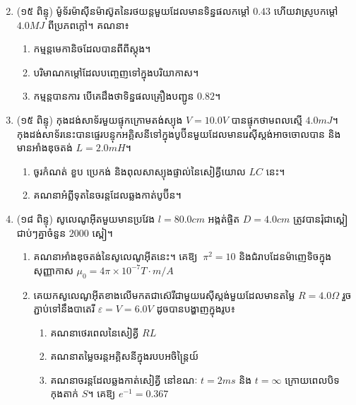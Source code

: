 \documentclass{officialexam}
\begin{document}
\begin{enumerate}[I]
\begin{multicols}{2}
\begin{tikzpicture}[x=1.0cm,y=1.0cm, scale=0.7]
			\end{tikzpicture}
		\end{multicols}
		\item (១៥ ពិន្ទុ)  ម៉ូទ័រម៉ាសុីនម៉ាស៊ូតនៃរថយន្តមួយដែលមានទិន្នផលកម្តៅ $0.43$ ហើយវាស្រូបកម្តៅ $4.0MJ$ ពីប្រភពក្តៅ។ គណនា៖
		\begin{enumerate}[k]
			\item កម្មន្តមេកានិចដែលបានពីពីស្តុង។
			\item បរិមាណកម្តៅដែលបញ្ចេញទៅក្នុងបរិយាកាស។
			\item កម្មន្តបានការ បើគេដឹងថាទិន្នផលគ្រឿងបញ្ជូន $0.82$។
		\end{enumerate}
		\item (១៥ ពិន្ទុ) កុងដង់សាទ័រមួយផ្ទុកក្រោមតង់ស្យុង $V=10.0V$ បានផ្ទុកថាមពលស្មើ $4.0mJ$។ កុងដង់សាទ័រនេះបានផ្ទេរបន្ទុកអគ្គិសនីទៅក្នុងបូប៊ីនមួយដែលមានរេសុីស្តង់អាចចោលបាន និងមានអាំងឌុចតង់ $L=2.0mH$។
		\begin{enumerate}[k]
			\item ចូរកំណត់ ខួប ប្រេកង់ និងពុល​​សា​​ស្យុងផ្ទាល់នៃសៀគ្វីយោល $LC$ នេះ។
			\item គណនាអំព្លីទុតនៃចរន្តដែលឆ្លងកាត់បូប៊ីន។
		\end{enumerate}
		\item (១៨ ពិន្ទុ) សូលេណូអុីតមួយមានប្រវែង $l=80.0cm$ អង្កត់ផ្ចិត $D=4.0cm$ ត្រូវបានរុំជា​​ស្ពៀ​​​​ជាប់ៗ​​គ្នាចំនួន $2000$ ស្ពៀ។
		\begin{enumerate}[m]
			\item គណនាអាំងឌុចតង់នៃសូលេណូអុីតនេះ។ គេឱ្យ $~\pi^2=10$ និងជំរាបដែនម៉ាញេទិចក្នុងសុញ្ញាកាស $\mu_0=4\pi\times10^{-7}T\cdot m/A$
			\item គេយកសូលេណូអុីតខាងលើមកតជាស៊េរីជាមួយរេសុីស្តង់មួយដែលមានតម្លៃ $R=4.0\Omega$ រួចភ្ជាប់ទៅនឹងបាតេរី $\varepsilon=V=6.0V$ ដូចបានបង្ហាញក្នុងរូប៖
			\begin{multicols}{2}
				\begin{enumerate}[k]
					\item គណនាថេរពេលនៃសៀគ្វី $RL$
					\item គណនាតម្លៃចរន្តអគ្គិសនីក្នុងរបបអចិ​​ន្រៃ្តយ៍
					\item គណនាចរន្តដែលឆ្លងកាត់សៀគ្វី នៅខណៈ $t=2ms$ និង $t=\infty$ ក្រោយពេលបិទកុងតាក់ $S$។
					គេឱ្យ $e^{-1}=0.367$
				\end{enumerate}

\end{multicols}
\end{enumerate}
\end{enumerate}
\end{document}
